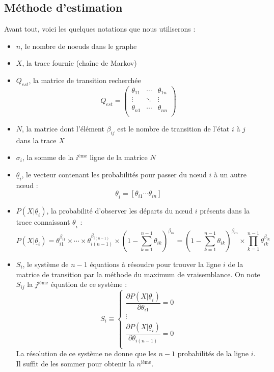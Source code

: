 \documentclass[a4paper,titlepage]{report}
\begin{document}
\subsection{Méthode d'estimation}
Avant tout, voici les quelques notations que nous utiliserons : 
\begin{itemize}
	\item $n$, le nombre de noeuds dans le graphe
	\item $X$, la trace fournie (chaîne de Markov)
	\item $Q_{est}$, la matrice de transition recherchée
	\[
		Q_{est} = 
		\begin{pmatrix}
			\theta_{11} & \cdots & \theta_{1n}\\
			\vdots & \ddots & \vdots\\
			\theta_{n1} & \cdots & \theta_{nn}\\
		\end{pmatrix}
	\]
	\item $N$, la matrice dont l'élément $\beta_{ij}$ est le nombre de transition de l'état $i$ à $j$ dans la trace $X$
	\item $\sigma_i$, la somme de la $i^{\text{ème}}$ ligne de la matrice $N$
	\item $\underline{\theta}_i$, le vecteur contenant les probabilités pour passer du nœud $i$ à un autre nœud : 
	\[
		\underline{\theta}_i = [\theta_{i1} \cdots \theta_{in}]
	\]
	\item $P(X|\underline{\theta}_i)$, la probabilité d'observer les départs du nœud $i$ présents dans la trace connaissant $\underline{\theta}_i$ :
	\[
		P(X|\underline{\theta}_i) = \theta_{i1}^{\beta_{i1}} \times \cdots \times \theta_{i(n - 1)}^{\beta_{i(n - 1)}} \times \left(1 - \sum\limits_{k = 1}^{n - 1} \theta_{ik}\right)^{\beta_{in}} = \left(1 - \sum\limits_{k = 1}^{n - 1} \theta_{ik}\right)^{\beta_{in}} \times \prod\limits_{k = 1}^{n - 1} \theta_{ik}^{\beta_{ik}}
	\]
	\item $S_i$, le système de $n - 1$ équations à résoudre pour trouver la ligne $i$ de la matrice de transition par la méthode du maximum de vraisemblance. On note $S_{ij}$ la $j^{\text{ième}}$ équation de ce système :
	\[
		S_i \equiv 
		\left\{
		\begin{array}{c}
		\dfrac{\partial P(X|\underline{\theta}_i)}{\partial \theta_{i1}} = 0\\
		\vdots\\
		\dfrac{\partial P(X|\underline{\theta}_i)}{\partial \theta_{i(n-1)}} = 0\\
		\end{array}
		\right.
	\] 
	La résolution de ce système ne donne que les $n-1$ probabilités de la ligne $i$. Il suffit de les sommer pour obtenir la $n^{\text{ième}}$.
\end{itemize}
\end{document}
